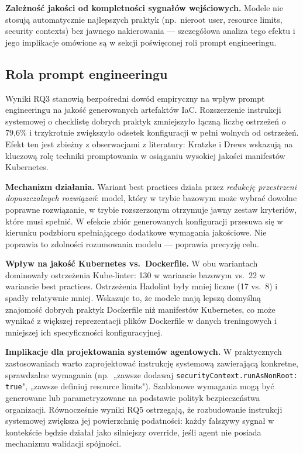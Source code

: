 \textbf{Zależność jakości od kompletności sygnałów wejściowych.} Modele nie stosują automatycznie najlepszych praktyk (np.\ nieroot user, resource limits, security contexts) bez jawnego nakierowania — szczegółowa analiza tego efektu i jego implikacje omówione są w sekcji poświęconej roli prompt engineeringu.

\subsection{Rola prompt engineeringu}

Wyniki RQ3 stanowią bezpośredni dowód empiryczny na wpływ prompt engineeringu na jakość generowanych artefaktów IaC. Rozszerzenie instrukcji systemowej o checklistę dobrych praktyk zmniejszyło łączną liczbę ostrzeżeń o 79{,}6\% i trzykrotnie zwiększyło odsetek konfiguracji w pełni wolnych od ostrzeżeń. Efekt ten jest zbieżny z obserwacjami z literatury: Kratzke i Drews \cite{kratzke_dont_2024} wskazują na kluczową rolę techniki promptowania w osiąganiu wysokiej jakości manifestów Kubernetes.

\textbf{Mechanizm działania.} Wariant best practices działa przez \textit{redukcję przestrzeni dopuszczalnych rozwiązań}: model, który w trybie bazowym może wybrać dowolne poprawne rozwiązanie, w trybie rozszerzonym otrzymuje jawny zestaw kryteriów, które musi spełnić. W efekcie zbiór generowanych konfiguracji przesuwa się w kierunku podzbioru spełniającego dodatkowe wymagania jakościowe. Nie poprawia to zdolności rozumowania modelu — poprawia precyzję celu.

\textbf{Wpływ na jakość Kubernetes vs.\ Dockerfile.} W obu wariantach dominowały ostrzeżenia Kube-linter: 130 w wariancie bazowym vs.\ 22 w wariancie best practices. Ostrzeżenia Hadolint były mniej liczne (17 vs.\ 8) i spadły relatywnie mniej. Wskazuje to, że modele mają lepszą domyślną znajomość dobrych praktyk Dockerfile niż manifestów Kubernetes, co może wynikać z większej reprezentacji plików Dockerfile w danych treningowych i mniejszej ich specyficzności konfiguracyjnej.

\textbf{Implikacje dla projektowania systemów agentowych.} W praktycznych zastosowaniach warto zaprojektować instrukcję systemową zawierającą konkretne, sprawdzalne wymagania (np.\ „zawsze dodawaj \texttt{securityContext.runAsNonRoot: true}", „zawsze definiuj resource limits"). Szablonowe wymagania mogą być generowane lub parametryzowane na podstawie polityk bezpieczeństwa organizacji. Równocześnie wyniki RQ5 ostrzegają, że rozbudowanie instrukcji systemowej zwiększa jej powierzchnię podatności: każdy fałszywy sygnał w kontekście będzie działał jako silniejszy override, jeśli agent nie posiada mechanizmu walidacji spójności.

